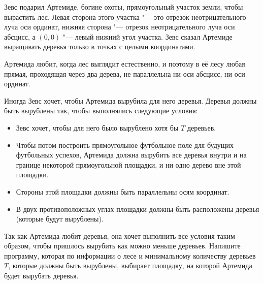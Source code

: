 
Зевс подарил Артемиде, богине охоты, прямоугольный участок земли,
чтобы вырастить лес.
Левая сторона этого участка "--- это отрезок неотрицательного
луча оси ординат, нижняя сторона "--- отрезок неотрицательного луча
оси абсцисс, а $(0, 0)$ "--- левый нижний угол участка.
Зевс сказал Артемиде выращивать деревья только в точках с целыми координатами.

Артемида любит, когда лес выглядит естественно,
и поэтому в её лесу любая прямая, проходящая через два дерева,
не параллельна ни оси абсцисс, ни оси ординат.

Иногда Зевс хочет, чтобы Артемида вырубила для него деревья.
Деревья должны быть вырублены так, чтобы выполнялись следующие условия:

\begin{itemize}
\item
Зевс хочет, чтобы для него было вырублено хотя бы $T$ деревьев.
\item
Чтобы потом построить прямоугольное футбольное поле для будущих
футбольных успехов, Артемида должна вырубить все деревья внутри
и на границе некоторой прямоугольной площадки, и ни одно дерево вне
этой площадки.
\item
Стороны этой площадки должны быть параллельны осям координат.
\item
В двух противоположных углах площадки должны быть расположены деревья
(которые будут вырублены).
\end{itemize}

Так как Артемида любит деревья, она хочет выполнить все условия таким образом,
чтобы пришлось вырубить как можно меньше деревьев.
Напишите программу, которая по информации о лесе и минимальному количеству
деревьев $T$, которые должны быть вырублены, выбирает площадку,
на которой Артемида будет вырубать деревья.

